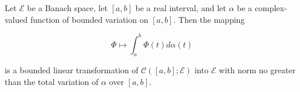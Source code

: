 Let $\mathcal{E}$ be a Banach space, let $[a, b]$ be a real interval, and let $\alpha$ be a complex-valued function of bounded variation on $[a, b]$. Then the mapping

$$\Phi \mapsto \int_a^b \Phi(t) d\alpha(t)$$

is a bounded linear transformation of $\mathcal{C}([a, b]; \mathcal{E})$ into $\mathcal{E}$ with norm no greater than the total variation of $\alpha$ over $[a, b]$.
